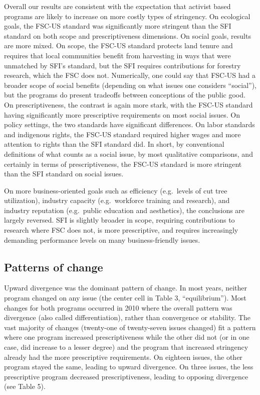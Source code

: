 \documentclass[
      12pt,
            Review ]{article}
\begin{document}
Overall our results are consistent with the expectation that activist
based programs are likely to increase on more costly types of
stringency. On ecological goals, the FSC-US standard was significantly
more stringent than the SFI standard on both scope and prescriptiveness
dimensions. On social goals, results are more mixed. On scope, the
FSC-US standard protects land tenure and requires that local communities
benefit from harvesting in ways that were unmatched by SFI's standard,
but the SFI requires contributions for forestry research, which the FSC
does not. Numerically, one could say that FSC-US had a broader scope of
social benefits (depending on what issues one considers ``social''), but
the programs do present tradeoffs between conceptions of the public
good. On prescriptiveness, the contrast is again more stark, with the
FSC-US standard having significantly more prescriptive requirements on
most social issues. On policy settings, the two standards have
significant differences. On labor standards and indigenous rights, the
FSC-US standard required higher wages and more attention to rights than
the SFI standard did. In short, by conventional definitions of what
counts as a social issue, by most qualitative comparisons, and certainly
in terms of prescriptiveness, the FSC-US standard is more stringent than
the SFI standard on social issues.

On more business-oriented goals such as efficiency (e.g.~levels of cut
tree utilization), industry capacity (e.g.~workforce training and
research), and industry reputation (e.g.~public education and
aesthetics), the conclusions are largely reversed. SFI is slightly
broader in scope, requiring contributions to research where FSC does
not, is more prescriptive, and requires increasingly demanding
performance levels on many business-friendly issues.

\subsection{Patterns of change}\label{patterns-of-change}

Upward divergence was the dominant pattern of change. In most years,
neither program changed on any issue (the center cell in Table 3,
``equilibrium''). Most changes for both programs occurred in 2010 where
the overall pattern was divergence (also called differentiation), rather
than convergence or stability. The vast majority of changes (twenty-one
of twenty-seven issues changed) fit a pattern where one program
increased prescriptiveness while the other did not (or in one case, did
increase to a lesser degree) and the program that increased stringency
already had the more prescriptive requirements. On eighteen issues, the
other program stayed the same, leading to upward divergence. On three
issues, the less prescriptive program decreased prescriptiveness,
leading to opposing divergence (see Table 5).
\end{document}
